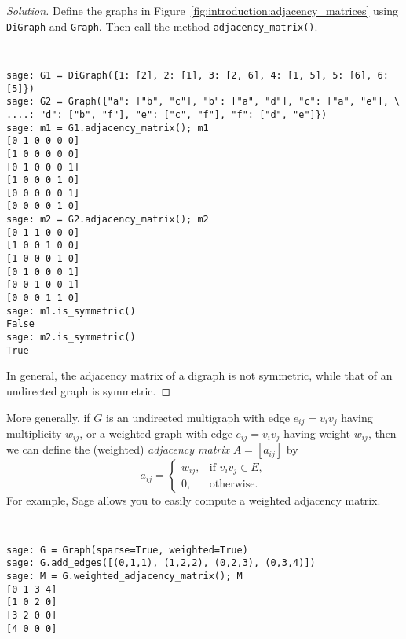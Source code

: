\begin{proof}[Solution]
Define the graphs in Figure~\ref{fig:introduction:adjacency_matrices}
using \verb!DiGraph! and \verb!Graph!. Then call the method
\verb!adjacency_matrix()!.
%
\begin{center}
\fontsize{9pt}{9pt}
\selectfont
\tt
\begin{lstlisting}
sage: G1 = DiGraph({1: [2], 2: [1], 3: [2, 6], 4: [1, 5], 5: [6], 6: [5]})
sage: G2 = Graph({"a": ["b", "c"], "b": ["a", "d"], "c": ["a", "e"], \
....: "d": ["b", "f"], "e": ["c", "f"], "f": ["d", "e"]})
sage: m1 = G1.adjacency_matrix(); m1
[0 1 0 0 0 0]
[1 0 0 0 0 0]
[0 1 0 0 0 1]
[1 0 0 0 1 0]
[0 0 0 0 0 1]
[0 0 0 0 1 0]
sage: m2 = G2.adjacency_matrix(); m2
[0 1 1 0 0 0]
[1 0 0 1 0 0]
[1 0 0 0 1 0]
[0 1 0 0 0 1]
[0 0 1 0 0 1]
[0 0 0 1 1 0]
sage: m1.is_symmetric()
False
sage: m2.is_symmetric()
True
\end{lstlisting}
\end{center}
%
In general, the adjacency matrix of a digraph is not symmetric, while
that of an undirected graph is symmetric.
\end{proof}


More generally, if $G$ is an undirected multigraph with edge
$e_{ij} = v_i v_j$ having multiplicity $w_{ij}$, or a weighted
graph with edge $e_{ij} = v_i v_j$ having weight $w_{ij}$, then we
can define the (weighted) \emph{adjacency matrix} $A = [a_{ij}]$ by
\[
a_{ij}
=
\begin{cases}
w_{ij}, & \text{if $v_i v_j \in E$}, \\
0,      & \text{otherwise}.
\end{cases}
\]
For example, Sage allows you to easily compute a weighted adjacency
matrix.
%
\begin{center}
\fontsize{9pt}{9pt}
\selectfont
\tt
\begin{lstlisting}
sage: G = Graph(sparse=True, weighted=True)
sage: G.add_edges([(0,1,1), (1,2,2), (0,2,3), (0,3,4)])
sage: M = G.weighted_adjacency_matrix(); M
[0 1 3 4]
[1 0 2 0]
[3 2 0 0]
[4 0 0 0]
\end{lstlisting}
\end{center}


